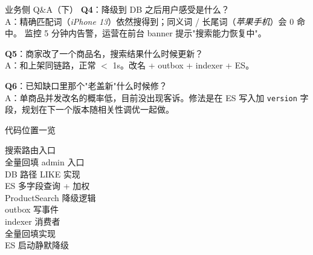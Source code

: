 \begin{frame}{业务侧 Q\&A（下）}
\textbf{Q4}：降级到 DB 之后用户感受是什么？\\
\hspace{4mm}\small A：精确匹配词（\textit{iPhone 13}）依然搜得到；同义词 / 长尾词（\textit{苹果手机}）会 0 命中。
监控 5 分钟内告警，运营在前台 banner 提示"搜索能力恢复中"。

\vspace{2mm}
\textbf{Q5}：商家改了一个商品名，搜索结果什么时候更新？\\
\hspace{4mm}\small A：和上架同链路，正常 $<$ 1s。改名 + outbox + indexer + ES。

\vspace{2mm}
\textbf{Q6}：已知缺口里那个"老盖新"什么时候修？\\
\hspace{4mm}\small A：单商品并发改名的概率低，目前没出现客诉。修法是在 ES 写入加 \texttt{version}
字段，规划在下一个版本随相关性调优一起做。
\end{frame}

\begin{frame}{代码位置一览}
\begin{description}
  \item[搜索路由入口]
  \item[全量回填 admin 入口]
  \item[DB 路径 LIKE 实现]
  \item[ES 多字段查询 + 加权]
  \item[ProductSearch 降级逻辑]
  \item[outbox 写事件]
  \item[indexer 消费者]
  \item[全量回填实现]
  \item[ES 启动静默降级]
\end{description}
\vspace{2mm}
\end{frame}


